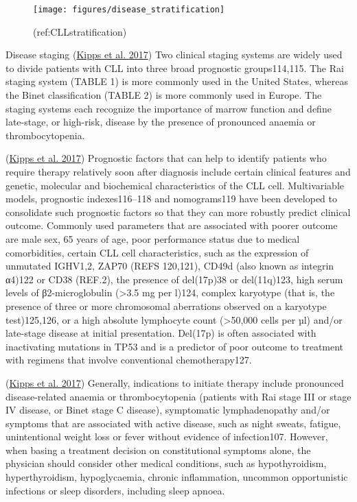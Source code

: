 \documentclass[11pt, a4paper, twosided]{book}
\begin{document}
\begin{figure}

{\centering \texttt{[image: figures/disease\_stratification]} 

}

\caption{(ref:CLLstratification)}\label{fig:CLLstratification}
\end{figure}
Disease staging
(\protect\hyperlink{ref-Kipps2017}{Kipps et al. 2017}) Two clinical staging systems are widely used to divide patients with CLL into three broad prognostic groups114,115. The Rai staging system (TABLE 1) is more commonly used in the United States, whereas the Binet classification (TABLE 2) is more commonly used in Europe. The staging systems each recognize the importance of marrow function and define late-stage, or high-risk, disease by the presence of pronounced anaemia or thrombocytopenia.

(\protect\hyperlink{ref-Kipps2017}{Kipps et al. 2017})
Prognostic factors that can help to identify patients who require therapy relatively soon after diagnosis include certain clinical features and genetic, molecular and biochemical characteristics of the CLL cell. Multivariable models, prognostic indexes116--118 and nomograms119 have been developed to consolidate such prognostic factors so that they can more robustly predict clinical outcome. Commonly used parameters that are associated with poorer outcome are male sex,
65 years of age, poor performance status due to medical
comorbidities, certain CLL cell characteristics, such as the expression of unmutated IGHV1,2, ZAP70 (REFS 120,121), CD49d (also known as integrin α4)122 or CD38 (REF.2), the presence of del(17p)38 or del(11q)123, high serum levels of β2-microglobulin (\textgreater3.5 mg per l)124, complex karyotype (that is, the presence of three or more chromosomal aberrations observed on a karyotype test)125,126, or a high absolute lymphocyte count (\textgreater50,000 cells per µl) and/or late-stage disease at initial presentation. Del(17p) is often associated with inactivating mutations in TP53 and is a predictor of poor outcome to treatment with regimens that involve conventional chemotherapy127.

(\protect\hyperlink{ref-Kipps2017}{Kipps et al. 2017})
Generally, indications to initiate therapy include pronounced disease-related anaemia or thrombocytopenia (patients with Rai stage III or stage IV disease, or Binet stage C disease), symptomatic lymphadenopathy and/or symptoms that are associated with active disease, such as night sweats, fatigue, unintentional weight loss or fever without evidence of infection107. However, when basing a treatment decision on constitutional symptoms alone, the physician should consider other medical conditions, such as hypothyroidism, hyperthyroidism, hypoglycaemia, chronic inflammation, uncommon opportunistic infections or sleep disorders, including sleep apnoea.
\end{document}
